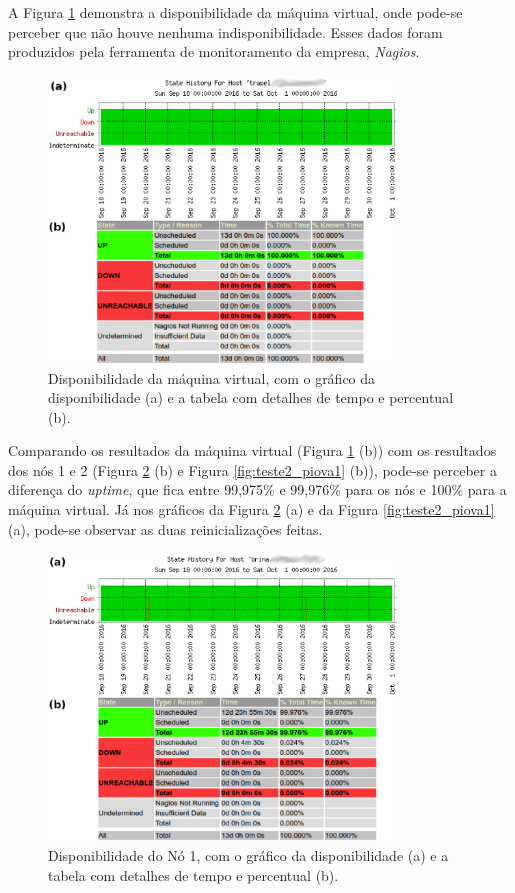 A Figura \ref{fig:teste2_trapel1} demonstra a disponibilidade da máquina virtual, onde pode-se perceber que não houve nenhuma indisponibilidade. 
Esses dados foram produzidos pela ferramenta de monitoramento da empresa, \textit{Nagios}. 
\begin{figure}[h!]
 \centering
 \includegraphics[width=350px]{img/teste2_trapel1.eps}
 \caption{Disponibilidade da máquina virtual, com o gráfico da disponibilidade (a) e a tabela com detalhes de tempo e percentual (b).}
 \label{fig:teste2_trapel1}
\end{figure}

Comparando os resultados da máquina virtual (Figura \ref{fig:teste2_trapel1} (b)) com os resultados dos nós 1 e 2 (Figura \ref{fig:teste2_brina1} 
(b) e Figura \ref{fig:teste2_piova1} (b)), pode-se perceber a diferença do \textit{uptime}, que fica entre 99,975\% e 99,976\% para os nós e 
100\% para a máquina virtual. Já nos gráficos da Figura \ref{fig:teste2_brina1} (a) e da Figura \ref{fig:teste2_piova1} (a), pode-se observar 
as duas reinicializações feitas.
\begin{figure}[h!]
 \centering
 \includegraphics[width=350px]{img/teste2_brina1.eps}
 \caption{Disponibilidade do Nó 1, com o gráfico da disponibilidade (a) e a tabela com detalhes de tempo e percentual (b).}
 \label{fig:teste2_brina1}
\end{figure}

